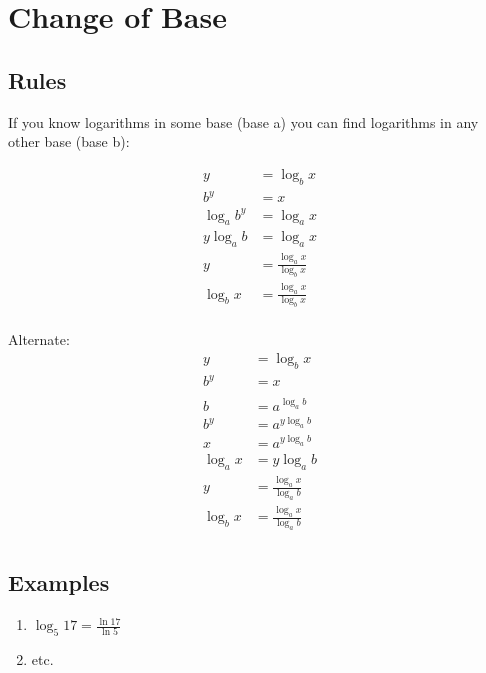 \documentclass{exam}
\begin{document}
  \section{Change of Base}

  \subsection{Rules}

  If you know logarithms in some base (base a) you can find logarithms in any other base (base b):

  \begin{align*}
    y          &= \log_b x \\
    b^y        &= x \\
    \log_a b^y &= \log_a x \\
    y \log_a b &= \log_a x \\
    y          &= \frac{\log_a x}{\log_b x} \\
    \log_b x   &= \frac{\log_a x}{\log_b x} \\
  \end{align*}

  Alternate:
  \begin{align*}
    y        &= \log_b x \\
    b^y      &= x \\
    \\
    b        &= a^{\log_a b} \\
    b^y      &= a^{y \log_a b} \\
    x        &= a^{y \log_a b} \\
    \log_a x &= y \log_a b \\
    y        &= \frac{\log_a x}{\log_a b} \\
    \log_b x &= \frac{\log_a x}{\log_a b} \\
  \end{align*}

  \subsection{Examples}

  \begin{enumerate}
    \item $\log_5 17 = \frac{\ln 17}{\ln 5}$ 
    \item etc.
  \end{enumerate}
\end{document}
